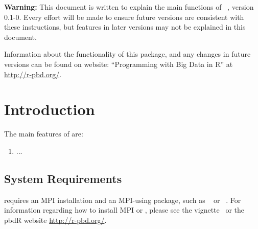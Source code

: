 {\color{red} \bf Warning:} This document is written to explain the main
functions of ~\citep{Gaurav2013pbdPROFpackage}, version 0.1-0.
Every effort will be made to ensure future versions are consistent with
these instructions, but features in later versions may not be explained
in this document.

Information about the functionality of this package,
and any changes in future versions can be found on website:
``Programming with Big Data in R'' at
\url{http://r-pbd.org/}.



\section{Introduction}
\label{sec:introduction}

The main features of  are:
\begin{enumerate}
\item ...
\end{enumerate}


\subsection[System Requirements]{System Requirements}
\label{sec:system_requirements}

 requires an MPI installation and an MPI-using package, such as ~\citep{Chen2012pbdMPIpackage} or
~\citep{Yu2010}.  For information regarding how to install MPI or , please see the  vignette~\citep{Chen2012pbdMPIvignette} or the pbdR website \url{http://r-pbd.org/}.

